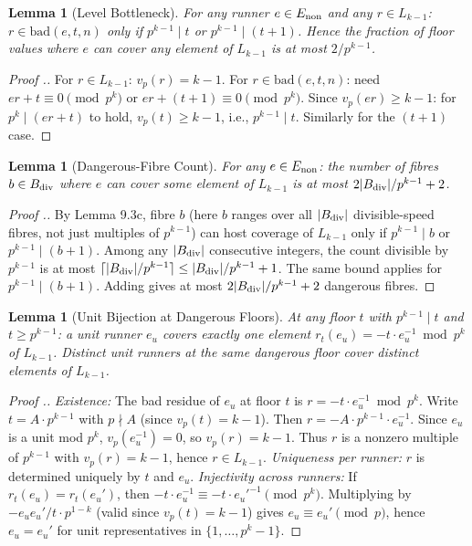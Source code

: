 \documentclass[11pt,a4paper]{article}
\theoremstyle{plain}
\newtheorem{lemma}[theorem]{Lemma}
\theoremstyle{definition}
\theoremstyle{remark}
\begin{document}
\begin{lemma}[Level Bottleneck]
For any runner $e \in E_{\rm non}$ and any $r \in L_{k-1}$: $r \in \mathrm{bad}(e, t, n)$ only if $p^{k-1} \mid t$ or $p^{k-1} \mid (t+1)$. Hence the fraction of floor values where $e$ can cover any element of $L_{k-1}$ is at most $2/p^{k-1}$.

\end{lemma}

\begin{proof}[Proof .]
For $r \in L_{k-1}$: $v_p(r) = k-1$. For $r \in \mathrm{bad}(e,t,n)$: need $er + t \equiv 0 \pmod{p^k}$ or $er + (t+1) \equiv 0 \pmod{p^k}$. Since $v_p(er) \geq k-1$: for $p^k \mid (er+t)$ to hold, $v_p(t) \geq k-1$, i.e., $p^{k-1} \mid t$. Similarly for the $(t+1)$ case.
\end{proof}


\begin{lemma}[Dangerous-Fibre Count]
For any $e \in E_{\rm non}$: the number of fibres $b \in B_{\rm div}$ where $e$ can cover some element of $L_{k-1}$ is at most $2|B_{\rm div}|/p^{k-1} + 2$.

\end{lemma}

\begin{proof}[Proof .]
By Lemma 9.3c, fibre $b$ (here $b$ ranges over all $|B_{\rm div}|$ divisible-speed fibres, not just multiples of $p^{k-1}$) can host coverage of $L_{k-1}$ only if $p^{k-1} \mid b$ or $p^{k-1} \mid (b+1)$. Among any $|B_{\rm div}|$ consecutive integers, the count divisible by $p^{k-1}$ is at most $\lceil |B_{\rm div}|/p^{k-1} \rceil \leq |B_{\rm div}|/p^{k-1} + 1$. The same bound applies for $p^{k-1} \mid (b+1)$. Adding gives at most $2|B_{\rm div}|/p^{k-1} + 2$ dangerous fibres.
\end{proof}


\begin{lemma}[Unit Bijection at Dangerous Floors]
At any floor $t$ with $p^{k-1} \mid t$ and $t \geq p^{k-1}$: a unit runner $e_u$ covers exactly one element $r_t(e_u) = -t \cdot e_u^{-1} \bmod p^k$ of $L_{k-1}$. Distinct unit runners at the same dangerous floor cover distinct elements of $L_{k-1}$.

\end{lemma}

\begin{proof}[Proof .]
\textit{Existence:} The bad residue of $e_u$ at floor $t$ is $r = -t \cdot e_u^{-1} \bmod p^k$. Write $t = A \cdot p^{k-1}$ with $p \nmid A$ (since $v_p(t) = k-1$). Then $r = -A \cdot p^{k-1} \cdot e_u^{-1}$. Since $e_u$ is a unit mod $p^k$, $v_p(e_u^{-1}) = 0$, so $v_p(r) = k-1$. Thus $r$ is a nonzero multiple of $p^{k-1}$ with $v_p(r) = k-1$, hence $r \in L_{k-1}$. \textit{Uniqueness per runner:} $r$ is determined uniquely by $t$ and $e_u$. \textit{Injectivity across runners:} If $r_t(e_u) = r_t(e_u')$, then $-t \cdot e_u^{-1} \equiv -t \cdot e_u'^{-1} \pmod{p^k}$. Multiplying by $-e_u e_u' / t \cdot p^{1-k}$ (valid since $v_p(t) = k-1$) gives $e_u \equiv e_u' \pmod{p}$, hence $e_u = e_u'$ for unit representatives in $\{1,\ldots,p^k-1\}$.
\end{proof}
\end{document}
